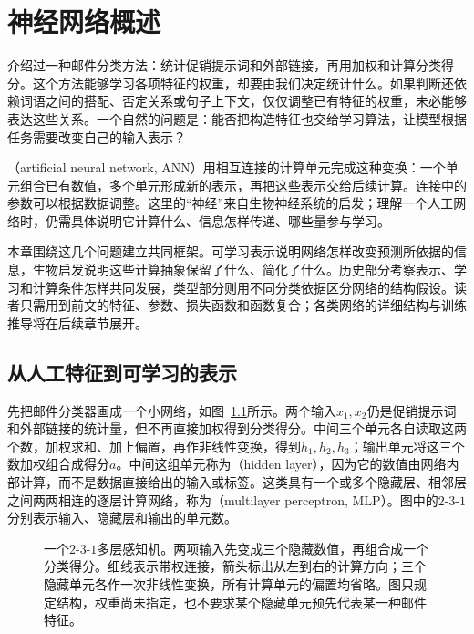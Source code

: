 \chapter{神经网络概述}
\label{chap:neural-network-overview}

介绍过一种邮件分类方法：统计促销提示词和外部链接，再用加权和计算分类得分。这个方法能够学习各项特征的权重，却要由我们决定统计什么。如果判断还依赖词语之间的搭配、否定关系或句子上下文，仅仅调整已有特征的权重，未必能够表达这些关系。一个自然的问题是：能否把构造特征也交给学习算法，让模型根据任务需要改变自己的输入表示？

（artificial neural network, ANN）用相互连接的计算单元完成这种变换：一个单元组合已有数值，多个单元形成新的表示，再把这些表示交给后续计算。连接中的参数可以根据数据调整。这里的“神经”来自生物神经系统的启发；理解一个人工网络时，仍需具体说明它计算什么、信息怎样传递、哪些量参与学习。

本章围绕这几个问题建立共同框架。可学习表示说明网络怎样改变预测所依据的信息，生物启发说明这些计算抽象保留了什么、简化了什么。历史部分考察表示、学习和计算条件怎样共同发展，类型部分则用不同分类依据区分网络的结构假设。读者只需用到前文的特征、参数、损失函数和函数复合；各类网络的详细结构与训练推导将在后续章节展开。

\section{从人工特征到可学习的表示}
\label{sec:neural-learned-representations}

先把邮件分类器画成一个小网络，如图~\ref{fig:neural-minimal-mlp}所示。两个输入$x_1,x_2$仍是促销提示词和外部链接的统计量，但不再直接加权得到分类得分。中间三个单元各自读取这两个数，加权求和、加上偏置，再作非线性变换，得到$h_1,h_2,h_3$；输出单元将这三个数加权组合成得分$a$。中间这组单元称为（hidden layer），因为它的数值由网络内部计算，而不是数据直接给出的输入或标签。这类具有一个或多个隐藏层、相邻层之间两两相连的逐层计算网络，称为（multilayer perceptron, MLP）。图中的$2$-$3$-$1$分别表示输入、隐藏层和输出的单元数。

\begin{figure}[htbp]
  \centering
  
  \caption{一个$2$-$3$-$1$多层感知机。两项输入先变成三个隐藏数值，再组合成一个分类得分。细线表示带权连接，箭头标出从左到右的计算方向；三个隐藏单元各作一次非线性变换，所有计算单元的偏置均省略。图只规定结构，权重尚未指定，也不要求某个隐藏单元预先代表某一种邮件特征。}
  \label{fig:neural-minimal-mlp}
\end{figure}
\FloatBarrier

